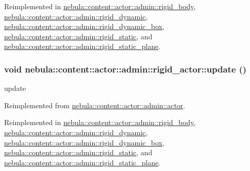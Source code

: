 Reimplemented in \hyperlink{classnebula_1_1content_1_1actor_1_1admin_1_1rigid__body_a91d4e1a3e78ee41a5ddea1974a88045d}{nebula::content::actor::admin::rigid\_\-body}, \hyperlink{classnebula_1_1content_1_1actor_1_1admin_1_1rigid__dynamic_ae5350e2820c0e00c36c663fc63a8b83c}{nebula::content::actor::admin::rigid\_\-dynamic}, \hyperlink{classnebula_1_1content_1_1actor_1_1admin_1_1rigid__dynamic__box_a2989dba143de5dabded9ca32702cccaa}{nebula::content::actor::admin::rigid\_\-dynamic\_\-box}, \hyperlink{classnebula_1_1content_1_1actor_1_1admin_1_1rigid__static_a6f209af8d75aa5159b4a2d75fcf2701a}{nebula::content::actor::admin::rigid\_\-static}, and \hyperlink{classnebula_1_1content_1_1actor_1_1admin_1_1rigid__static__plane_af1c2da35d02592bf5cad8823775bb2d7}{nebula::content::actor::admin::rigid\_\-static\_\-plane}.\hypertarget{classnebula_1_1content_1_1actor_1_1admin_1_1rigid__actor_a3c0adb150e7bfb43c209e6dc102253a5}{
\subsubsection[{update}]{\setlength{\rightskip}{0pt plus 5cm}void nebula::content::actor::admin::rigid\_\-actor::update ()}}
\label{classnebula_1_1content_1_1actor_1_1admin_1_1rigid__actor_a3c0adb150e7bfb43c209e6dc102253a5}


update 

Reimplemented from \hyperlink{classnebula_1_1content_1_1actor_1_1admin_1_1actor_a9290e8e1981731fe362d3995cf010514}{nebula::content::actor::admin::actor}.

Reimplemented in \hyperlink{classnebula_1_1content_1_1actor_1_1admin_1_1rigid__body_aacabe8d617dd48c2ffec43edae75553d}{nebula::content::actor::admin::rigid\_\-body}, \hyperlink{classnebula_1_1content_1_1actor_1_1admin_1_1rigid__dynamic_a2bf9e18773b7db87cb35fef56274405a}{nebula::content::actor::admin::rigid\_\-dynamic}, \hyperlink{classnebula_1_1content_1_1actor_1_1admin_1_1rigid__dynamic__box_ad0c1ca664351042f80ede5ed0a5bba0a}{nebula::content::actor::admin::rigid\_\-dynamic\_\-box}, \hyperlink{classnebula_1_1content_1_1actor_1_1admin_1_1rigid__static_af7ecdabc256260e8ae07436b3bc4854f}{nebula::content::actor::admin::rigid\_\-static}, and \hyperlink{classnebula_1_1content_1_1actor_1_1admin_1_1rigid__static__plane_ad14b9160b7c1aa9ae29d52141d1b6221}{nebula::content::actor::admin::rigid\_\-static\_\-plane}.

